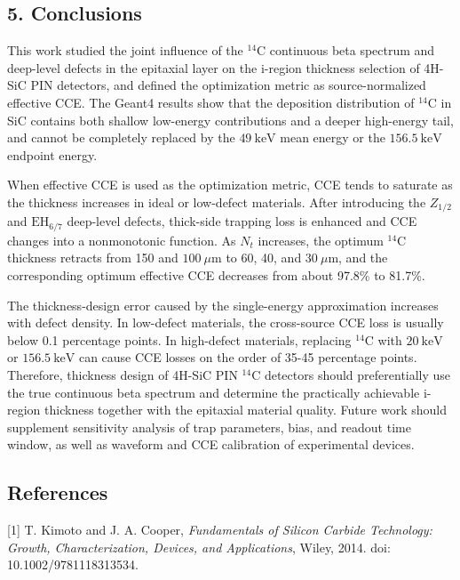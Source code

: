 \documentclass[
  10pt,
  a4paper,
]{article}
\begin{document}
\subsection{5. Conclusions}\label{conclusions}

This work studied the joint influence of the \(^{14}\mathrm{C}\)
continuous beta spectrum and deep-level defects in the epitaxial layer
on the i-region thickness selection of 4H-SiC PIN detectors, and defined
the optimization metric as source-normalized effective CCE. The Geant4
results show that the deposition distribution of \(^{14}\mathrm{C}\) in
SiC contains both shallow low-energy contributions and a deeper
high-energy tail, and cannot be completely replaced by the
\(49\ \mathrm{keV}\) mean energy or the \(156.5\ \mathrm{keV}\) endpoint
energy.

When effective CCE is used as the optimization metric, CCE tends to
saturate as the thickness increases in ideal or low-defect materials.
After introducing the \(Z_{1/2}\) and \(\mathrm{EH}_{6/7}\) deep-level
defects, thick-side trapping loss is enhanced and CCE changes into a
nonmonotonic function. As \(N_t\) increases, the optimum
\(^{14}\mathrm{C}\) thickness retracts from 150 and
\(100\ \mu\mathrm{m}\) to 60, 40, and \(30\ \mu\mathrm{m}\), and the
corresponding optimum effective CCE decreases from about 97.8\% to
81.7\%.

The thickness-design error caused by the single-energy approximation
increases with defect density. In low-defect materials, the cross-source
CCE loss is usually below 0.1 percentage points. In high-defect
materials, replacing \(^{14}\mathrm{C}\) with \(20\ \mathrm{keV}\) or
\(156.5\ \mathrm{keV}\) can cause CCE losses on the order of 35-45
percentage points. Therefore, thickness design of 4H-SiC PIN
\(^{14}\mathrm{C}\) detectors should preferentially use the true
continuous beta spectrum and determine the practically achievable
i-region thickness together with the epitaxial material quality. Future
work should supplement sensitivity analysis of trap parameters, bias,
and readout time window, as well as waveform and CCE calibration of
experimental devices.

\subsection{References}\label{references}

\begingroup
\small

{[}1{]} T. Kimoto and J. A. Cooper, \emph{Fundamentals of Silicon
Carbide Technology: Growth, Characterization, Devices, and
Applications}, Wiley, 2014. doi: 10.1002/9781118313534.
\end{document}
